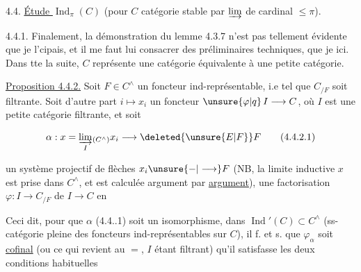 

4.4. \uline{Étude } $\operatorname{Ind}_\pi(C)$ (pour $C$  catégorie stable par $\varinjlim$ de cardinal $\leq\pi$).

4.4.1. Finalement, la démonstration du lemme 4.3.7 n'est pas tellement évidente que je l'cipais, et il me faut lui consacrer des préliminaires techniques, que je  ici. Dans tte la suite, $C$ représente une catégorie équivalente à une petite catégorie.

\uline{Proposition 4.4.2.} Soit $F\in C^\wedge$ un foncteur ind-représentable, i.e tel que $C_{/F}$ soit filtrante. Soit d'autre part $i\longmapsto x_i$ un foncteur $\unsure{\varphi|q}\,I\longrightarrow C$, où $I$ est une petite catégorie filtrante, et  soit

\[
\alpha:x=\varinjlim_I{}_{\!(C^\wedge)}x_i\longrightarrow \deleted{\unsure{E|F}}F
\tag*{(4.4.2.1)}
\]


un système projectif de flèches $x_i\unsure{-|\longrightarrow} F$ (NB, la limite inductive $x$ est prise dans $C^\wedge$, et est calculée argument par \uline{argument}),   une factorisation $\varphi:I\longrightarrow C_{/F}$ de $I\longrightarrow C$ en


Ceci dit, pour que $\alpha$ (4.4..1) soit un isomorphisme, dans $\operatorname{Ind}'(C)\subset C^\wedge$ (ss-catégorie pleine des foncteurs ind-représentables sur $C$), il f. et s. que $\varphi_\alpha$ soit \uline{cofinal} (ou ce qui revient au $=$, $I$ étant filtrant) qu'il satisfasse les deux conditions habituelles

